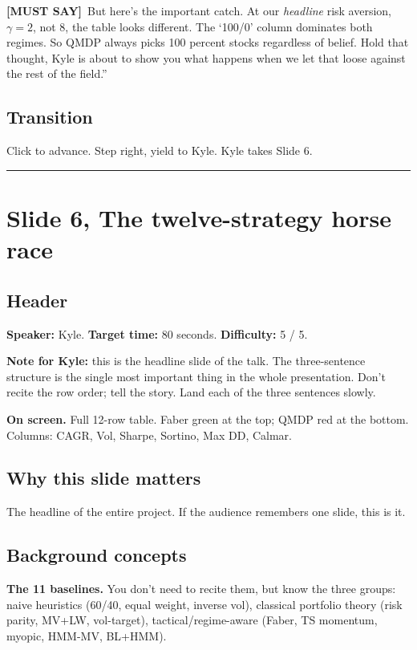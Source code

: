 \documentclass[11pt]{article}
\newcommand{\mustsay}[1]{\textcolor{must}{\textbf{[MUST SAY]}}\ #1}
\begin{document}
\mustsay{But here's the important catch. At our \emph{headline} risk aversion, $\gamma = 2$, not 8, the table looks different. The `100/0' column dominates both regimes. So QMDP always picks 100 percent stocks regardless of belief. Hold that thought, Kyle is about to show you what happens when we let that loose against the rest of the field.''}

\subsection*{Transition}

Click to advance. Step right, yield to Kyle. Kyle takes Slide 6.

\bigskip\hrule

\section*{Slide 6, The twelve-strategy horse race}

\subsection*{Header}

\textbf{Speaker:} Kyle. \quad\textbf{Target time:} 80 seconds. \quad\textbf{Difficulty:} 5 / 5.

\textbf{Note for Kyle:} this is the headline slide of the talk. The three-sentence structure is the single most important thing in the whole presentation. Don't recite the row order; tell the story. Land each of the three sentences slowly.

\textbf{On screen.} Full 12-row table. Faber green at the top; QMDP red at the bottom. Columns: CAGR, Vol, Sharpe, Sortino, Max DD, Calmar.

\subsection*{Why this slide matters}

The headline of the entire project. If the audience remembers one slide, this is it.

\subsection*{Background concepts}

\textbf{The 11 baselines.} You don't need to recite them, but know the three groups: naive heuristics (60/40, equal weight, inverse vol), classical portfolio theory (risk parity, MV+LW, vol-target), tactical/regime-aware (Faber, TS momentum, myopic, HMM-MV, BL+HMM).
\end{document}
